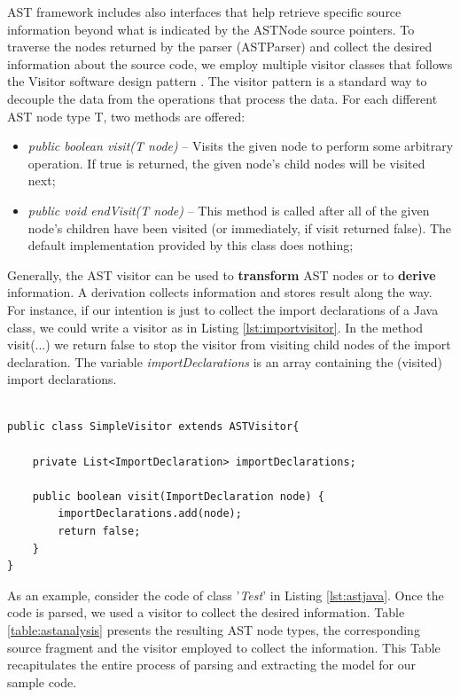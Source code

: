 AST framework includes also interfaces that help retrieve specific source information beyond what is indicated by the ASTNode source pointers. To traverse the nodes returned by the parser (ASTParser) and collect the desired information about the source code, we employ multiple visitor classes that follows the Visitor software design pattern \cite{gamma1994design}. 
The visitor pattern is a standard way to decouple the data from the operations that process the data.
For each different AST node type T, two methods are offered:

\begin{itemize}

\item  \textit{public boolean visit(T node)} -- Visits the given node to perform some arbitrary operation. If true is returned, the given node's child nodes will be visited next;
\item  \textit{public void endVisit(T node)} --  This method is called after all of the given node's children have been visited (or immediately, if visit returned false). The default implementation provided by this class does nothing;
\end{itemize}

Generally, the AST visitor can be used to \textbf{transform} AST nodes or to \textbf{derive} information. A derivation collects information and stores result along the way. For instance, if our intention is just to collect the import declarations of a Java class, we could write a visitor as in Listing \ref{lst:importvisitor}. In the method visit(...) we return false to stop the visitor from visiting child nodes of the import declaration. The variable \textit{importDeclarations} is an array containing the (visited) import declarations. 

\begin{lstlisting}[style=java, caption=A visitor for Import declarations in Java source code, label=lst:importvisitor]

public class SimpleVisitor extends ASTVisitor{

	private List<ImportDeclaration> importDeclarations;

	public boolean visit(ImportDeclaration node) {
	    importDeclarations.add(node);
	    return false;
	}
}
\end{lstlisting}

As an example, consider the code of class '\textit{Test}' in Listing \ref{lst:astjava}. Once the code is parsed, we used a visitor to collect the desired information. Table \ref{table:astanalysis} presents the resulting AST node types, the corresponding source fragment and the visitor employed to collect the information. This Table recapitulates the entire process of parsing and extracting the model for our sample code. 


